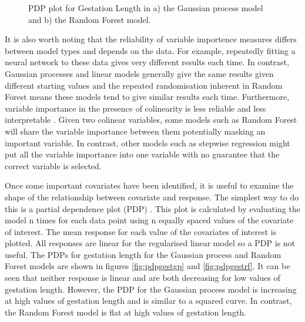 \documentclass[10pt,]{article}
\begin{document}
\begin{figure}[t!]
  \centering

  \label{fig:pdp}
  \caption{
    PDP plot for Gestation Length in a) the Gaussian process model and b) the Random Forest model.
  }
\end{figure}

It is also worth noting that the reliability of variable importence measures differs between model types and depends on the data. For example, repeatedly fitting a neural network to these data gives very different results each time. In contrast, Gaussian processes and linear models generally give the same results given different starting values and the repeated randomisation inherent in Random Forest means these models tend to give similar results each time. Furthermore, variable importance in the presence of colinearity is less reliable and less interpretable \citep{dormann2013collinearity}. Given two colinear variables, some models such as Random Forest will share the variable importance between them potentially masking an important variable. In contrast, other models such as stepwise regression might put all the variable importance into one variable with no guarantee that the correct variable is selected.

Once some important covariates have been identified, it is useful to examine the shape of the relationship between covariate and response. The simplest way to do this is a partial dependence plot (PDP) \citep{Friedman2001}. This plot is calculated by evaluating the model n times for each data point using n equally spaced values of the covariate of interest. The mean response for each value of the covariates of interest is plotted. All responses are linear for the regularised linear model so a PDP is not useful. The PDPs for gestation length for the Gaussian process and Random Forest models are shown in figures \ref{fig:pdpgestgp} and \ref{fig:pdpgestrf}. It can be seen that neither response is linear and are both decreasing for low values of gestation length. However, the PDP for the Gaussian process model is increasing at high values of gestation length and is similar to a squared curve. In contrast, the Random Forest model is flat at high values of gestation length.
\end{document}
